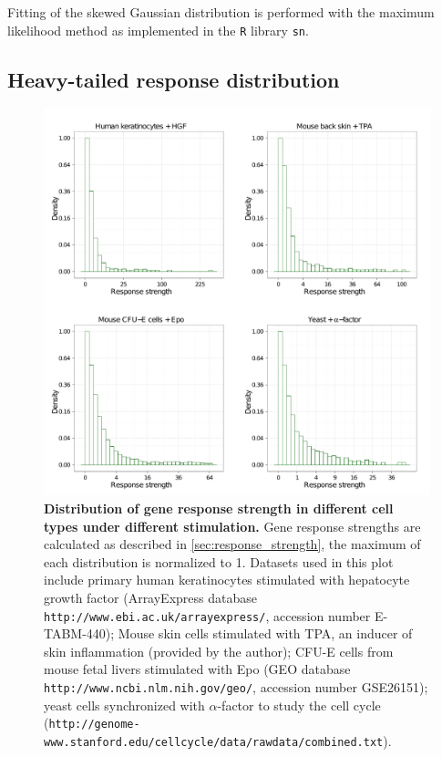 Fitting of the skewed Gaussian distribution is performed with
the maximum likelihood method as implemented in the 
\texttt{R}
library \texttt{sn}.

\subsection{Heavy-tailed response distribution}

\begin{figure}[!ht]
\begin{center}
\includegraphics[width=\textwidth]{network/fig/response_all.pdf}
\end{center}
\caption[Heavy-tail distribution of gene response strength]{
{\bf Distribution of gene response strength in different
cell types under different stimulation.}
Gene response strengths are calculated as described in 
\ref{sec:response_strength}, the maximum of each distribution
is normalized to 1. Datasets used in this plot include 
primary human keratinocytes 
stimulated with hepatocyte growth factor (ArrayExpress database 
\texttt{http://www.ebi.ac.uk/arrayexpress/},
accession number E-TABM-440); Mouse skin cells stimulated with TPA,
an inducer of skin inflammation (provided by the author); 
CFU-E cells from mouse fetal livers stimulated
with Epo (GEO database \texttt{http://www.ncbi.nlm.nih.gov/geo/}, accession
number GSE26151); yeast cells synchronized with 
$\alpha$-factor to study the cell cycle
\\(\texttt{http://genome-www.stanford.edu/cellcycle/data/rawdata/combined.txt}).
}
\label{fig:response_strength}
\end{figure}

